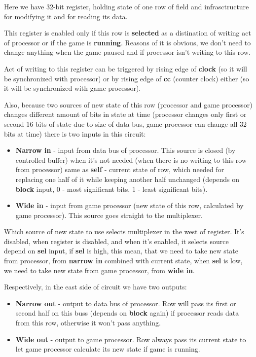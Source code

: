 Here we have 32-bit register, holding state of one row of field and infrasctructure for modifying it and for reading its data. 

This register is enabled only if this row is \textbf{selected} as a distination of writing act of processor or if the game is \textbf{running}. Reasons of it is obvious, we don't need to change anything when the game paused and if processor isn't writing to this row.

Act of writing to this register can be triggered by rising edge of \textbf{clock} (so it will be synchronized with processor) or by rising edge of \textbf{cc} (counter clock) either (so it will be synchronized with game processor).

Also, because two sources of new state of this row (processor and game processor) changes different amount of bits in state at time (processor changes only first or second 16 bits of state due to size of data bus, game processor can change all 32 bits at time) there is two inputs in this circuit:

\begin{itemize}
	\item \textbf{Narrow in} - input from data bus of processor. This source is closed (by controlled buffer) when it's not needed (when there is no writing to this row from processor) same as \textbf{self} - current state of row, which needed for replacing one half of it while keeping another half unchanged (depends on \textbf{block} input, 0 - most significant bits, 1 - least significant bits).
	\item \textbf{Wide in} - input from game processor (new state of this row, calculated by game processor). This source goes straight to the multiplexer.
\end{itemize}

Which source of new state to use selects multiplexer in the west of register. It's disabled, when register is disabled, and when it's enabled, it selects source depend on \textbf{sel} input, if \textbf{sel} is high, this mean, that we need to take new state from processor, from \textbf{narrow in} combined with current state, when \textbf{sel} is low, we need to take new state from game processor, from \textbf{wide in}.

Respectively, in the east side of circuit we have two outputs:

\begin{itemize}
	\item \textbf{Narrow out} - output to data bus of processor. Row will pass its first or second half on this buss (depends on \textbf{block} again) if processor reads data from this row, otherwise it won't pass anything.
	\item \textbf{Wide out} - output to game processor. Row always pass its current state to let game processor calculate its new state if game is running.
\end{itemize}

